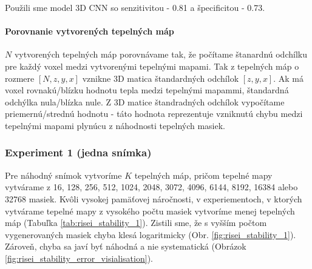 Použili sme model 3D CNN so senzitivitou - 0.81 a špecificitou - 0.73.

\paragraph{Porovnanie vytvorených tepelných máp}

$N$ vytvorených tepelných máp porovnávame tak, že počítame štanardnú odchílku pre každý voxel medzi vytvorenými tepelnými mapami. Tak z tepelných máp o rozmere $[N, z, y, x]$ vznikne 3D matica štandardných odchílok $[z, y, x]$. Ak má voxel rovnakú/blízku hodnotu tepla medzi tepelnými mapammi, štandardná odchýlka nula/blízka nule. Z 3D matice štandradných odchílok vypočítame priemernú/strednú hodnotu - táto hodnota reprezentuje vzniknutú chybu medzi tepelnými mapami plynúcu z náhodnosti tepelných masiek.

\subsubsection{Experiment 1 (jedna snímka) \label{sec:risei_stability_1}}

Pre náhodný snímok vytvoríme $K$ tepelných máp, pričom tepelné mapy vytvárame z 16, 128, 256, 512, 1024, 2048, 3072, 4096, 6144, 8192, 16384 alebo 32768 masiek. Kvôli vysokej pamäťovej náročnosti, v experiementoch, v ktorých vytvárame tepelné mapy z vysokého počtu masiek vytvoríme menej tepelných máp (Tabuľka \ref{tab:risei_stability_1}). Zistili sme, že s vyšším počtom vygenerovaných masiek chyba klesá logaritmicky (Obr. \ref{fig:risei_stability_1}). Zároveň, chyba sa javí byť náhodná a nie systematická (Obrázok \ref{fig:risei_stability_error_visialisation}).

